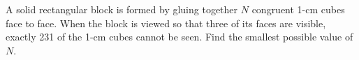 A solid rectangular block is formed by gluing together $N$ congruent 1-cm cubes face to face. When the block is viewed so that three of its faces are visible, exactly 231 of the 1-cm cubes cannot be seen. Find the smallest possible value of $N$.